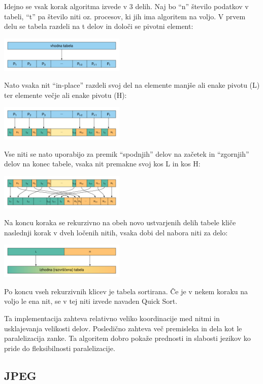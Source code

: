 \documentclass[journal,a4paper,twoside]{sty/IEEEtran}
\begin{document}
Idejno se vsak korak algoritma izvede v 3 delih.
Naj bo “n” število podatkov v tabeli, “t” pa število niti oz. procesov, ki jih ima algoritem na voljo.
V prvem delu se tabela razdeli na t delov in določi se pivotni element:

\includegraphics[width=0.45\textwidth]{aqs_diag_1}

Nato vsaka nit “in-place” razdeli svoj del na elemente manjše ali enake pivotu (L) ter elemente večje ali enake pivotu (H):

\includegraphics[width=0.45\textwidth]{aqs_diag_2}

Vse niti se nato uporabijo za premik “spodnjih” delov na začetek in “zgornjih” delov na konec tabele, vsaka nit premakne svoj kos L in kos H:

\includegraphics[width=0.45\textwidth]{aqs_diag_3}

Na koncu koraka se rekurzivno na obeh novo ustvarjenih delih tabele kliče naslednji korak v dveh ločenih nitih, vsaka dobi del nabora niti za delo:

\includegraphics[width=0.45\textwidth]{aqs_diag_4}

Po koncu vseh rekurzivnih klicev je tabela sortirana.
Če je v nekem koraku na voljo le ena nit, se v tej niti izvede navaden Quick Sort.

Ta implementacija zahteva relativno veliko koordinacije med nitmi in usklajevanja velikosti delov.
Posledično zahteva več premisleka in dela kot le paralelizacija zanke.
Ta algoritem dobro pokaže prednosti in slabosti jezikov ko pride do fleksibilnosti paralelizacije.

\subsection{JPEG}
\end{document}
